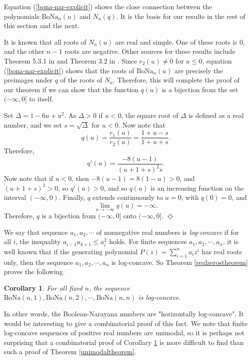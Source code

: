\documentclass[11pt]{article}
\newcommand{\bona}{\mathrm{BoNa}}
\newcommand{\qed}{\mbox{$\Diamond$}\vspace{\baselineskip}}
\newtheorem{corollary}[theorem]{Corollary}
\newenvironment{proof}{\noindent {\bf Proof:}}{{\qed}}
\begin{document}
\begin{proof}
Equation (\ref{bona-nar-explicit}) shows the close connection between the polynomials \(\mathrm{BoNa}_n(u)\) and
\(N_n(q)\). It is the basis for our results in the rest of this section and the next.

It is known \cite{shen} that all roots of \(N_n(u)\) are real and simple. One of these roots is \(0\),
and the other \(n-1\) roots are negative. Other sources for these results include Theorem 5.3.1 in \cite{brenti}
and Theorem 3.2 in \cite{shen}.  Since \(r_2(u)\neq 0\) for \(u\le 0\), equation (\ref{bona-nar-explicit}) shows that the roots
of \(\mathrm{BoNa}_n(u)\) are precisely the preimages under \(q\) of the roots of \(N_n\). Therefore,
this will complete the proof of our theorem if we can show that the function \(q(u)\) is a bijection
from the set \((-\infty,0]\) to itself.

Set \(\Delta=1-6u+u^2\). As \(\Delta>0\) if \(u<0\), the square root of \(\Delta\) is defined as a real
number, and we set \(s=\sqrt{\Delta}\) for \(u<0\). Now note that
\[
q(u)=\frac{r_1(u)}{r_2(u)}=\frac{1+u-s}{1+u+s}.
\]
Therefore,
\[
q'(u)=\frac{-8(u-1)}{(u+1+s)^2s}.
\]
Now note that if \(u<0\), then \(-8(u-1)=8(1-u)>0\), and \((u+1+s)^2>0\), so \(q'(u)>0\), and so
\(q(u)\) is an increasing function on the interval \((-\infty,0)\). Finally, \(q\) extends continuously
to \(u=0\), with \(q(0)=0\), and
\[
\lim_{u\to -\infty} q(u)=-\infty.
\]
Therefore, \(q\) is a bijection from \((-\infty,0]\) onto \((-\infty,0]\).
\end{proof}



We say that  sequence $a_1, a_2, \cdots $ of nonnegative real numbers is  {\em log-concave}  if for all $i$, the inequality $a_{i-1}a_{k+1}\leq a_i^2$ holds. 
For finite sequences $a_1,a_2,\cdots ,a_n$, it is well known \cite{brenti} that if the generating polynomial $P(z)=\sum_{i=1}^n a_i z^i$ has real roots only, then the sequence
$a_1,a_2,\cdots ,a_n$ is log-concave. So Theorem \ref{realzerostheorem}  proves the following.

\begin{corollary} \label{logccor}  For all fixed $n$, the sequence $\bona(n,1),\bona(n,2),\cdots ,\bona(n,n)$ is log-concave. \end{corollary}
In other words, the Boolean-Narayana numbers are "horizontally log-concave". 
It would be interesting to give a combinatorial proof of this fact. We note that finite log-concave sequences of positive real numbers are unimodal, so it is perhaps not 
surprising that a combinatorial proof of Corollary \ref{logccor} is more difficult to find than such a proof of Theorem \ref{unimodaltheorem}. 
\end{document}
